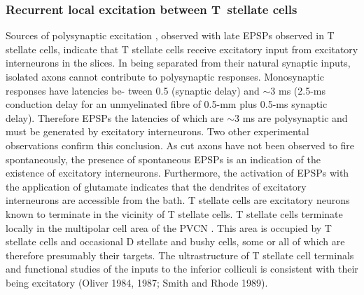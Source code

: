 


\subsubsection{Recurrent local excitation between T~stellate cells}




 
Sources of polysynaptic excitation \citep{FerragamoGoldingEtAl:1998a}, observed with late EPSPs observed in T stellate cells, indicate that
 T stellate cells receive excitatory input from excitatory interneurons in the slices. In being separated from their natural
 synaptic inputs, isolated axons cannot contribute to polysynaptic responses. 
Monosynaptic responses have latencies be-
 tween 0.5 (synaptic delay) and $\sim$3 ms (2.5-ms conduction
 delay for an unmyelinated fibre of 0.5-mm plus 0.5-ms synaptic delay). Therefore EPSPs the latencies of which are
 $\sim$3 ms are polysynaptic and must be generated by excitatory
 interneurons. Two other experimental observations confirm
 this conclusion. As cut axons have not been observed to fire
 spontaneously, the presence of spontaneous EPSPs is an
 indication of the existence of excitatory interneurons. Furthermore, the activation of EPSPs with the application of
 glutamate indicates that the dendrites of excitatory interneurons are accessible from the bath.
 T stellate cells are excitatory neurons known to terminate
 in the vicinity of T stellate cells. T stellate cells terminate
 locally in the multipolar cell area of the PVCN \citep{FerragamoGoldingEtAl:1998a}. This area is occupied by T stellate
 cells and occasional D stellate and bushy cells, some or all
 of which are therefore presumably their targets. The ultrastructure of T stellate cell terminals and functional studies
of the inputs to the inferior colliculi is consistent with their
 being excitatory (Oliver 1984, 1987; Smith and Rhode
 1989).

